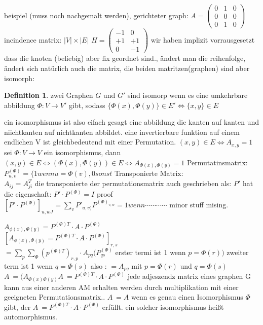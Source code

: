 \documentclass[a4paper]{article}
\theoremstyle{definition}
\newtheorem*{definition}{Definition}
\theoremstyle{remark}
\begin{document}
beispiel (muss noch nachgemalt werden), gerichteter graph:
  $A= \begin{pmatrix}
  0&1&0\\0&0&0\\0&1&0
  \end{pmatrix}
$
incindence matrix: $|V|\times|E|$
$H= \begin{pmatrix}
-1&0\\+1&+1\\0&-1
\end{pmatrix}$
wir haben implizit vorrausgesetzt dass die knoten (beliebig) aber fix geordnet sind., ändert man die reihenfolge, ändert sich natürlich auch die matrix, die beiden matritzen(graphen) sind aber isomorph:\\
\begin{definition}
  
  zwei Graphen $G$ und $G'$ sind isomorp wenn es eine umkehrbare abbildung $\Phi:V\rightarrow V'$ gibt, sodass $\{\Phi (x),\Phi (y)\}\in E' \Leftrightarrow \{x,y\} \in E $
\end{definition}
ein isomorphismus ist also eifach gesagt eine abbildung die kanten auf kanten und niichtkanten auf nichtkanten abbildet.
eine invertierbare funktion auf einem endlichen V ist gleichbedeutend mit einer Permutation.
$(x,y)\in E \Leftrightarrow A_{x,y}=1$
sei $\Phi:V\rightarrow V$ ein isomorphismus, dann\\
$(x,y)\in E \Leftrightarrow (\Phi (x),\Phi (y))\in E \Leftrightarrow A_{\Phi (x),\Phi (y)}=1$
Permutatinsmatrix:
$P^{(\Phi )}_{u,v}=\{ 1 wenn u=\Phi (v), 0 sonst$
Transponierte Matrix:\\
$A_{ij}=A^{T}_{ji}$
die transponierte der permutationsmatrix auch geschrieben als: 
$P'$ hat die eigenschaft:
$P'\cdot P^{(\Phi )}=I$ 
proof\\
$[P'\cdot P^{(\Phi )}]_{u,wJ}= \sum_{v} P'_{u,v)}P^{(\Phi )_{v,w}}= 1 wenn \cdots\cdots\cdots\cdots$
minor stuff mising.

$A_{\phi (x),\Phi (y)}= P^{(\Phi ) T}\cdot A\cdot P^{(\Phi )}$\\

$[A_{\phi (x),\Phi (y)}= P^{(\Phi ) T}\cdot A\cdot P^{(\Phi )}]_{r,s}$\\
$= \sum_{p}^{}\sum_{\Phi} (p^{(\Phi )T})_{r,p}\cdot A_{pq}(P^{(\Phi )}_{qs}$
erster termi ist 1 wenn $p=\Phi (r)) $ zweiter term ist 1 wenn $ q=\Phi (s)$
 also :
 $= A_{pq}$ mit $p=\Phi (r)$ und  $q=\Phi (s)$
 $ A^{~}= (A_{\Phi (x) \Phi (y)}
   A^{~}=  P^{(\Phi ) T}\cdot A\cdot P^{(\Phi )}$ 
   jede adjeszendz matrix eines graphen G kann aus einer anderen AM erhalten werden durch multiplikation mit einer geeigneten Permutationsmatrix..
   $A^{~}= A$ wenn es genau einen Isomorphismus $\Phi $ gibt, der $A^{~}=P^{(\Phi ) T}\cdot A\cdot P^{(\Phi )}$ erfüllt.
   ein solcher isomorphismus heißt automorphismus.
\end{document}
